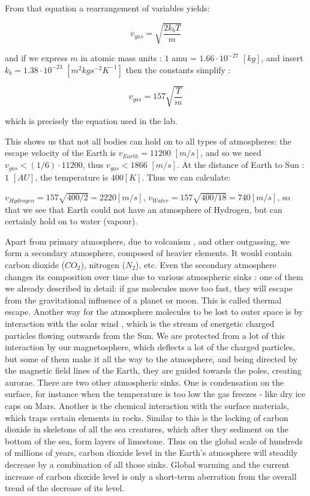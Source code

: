 \documentclass[paper=a4, fontsize=11pt]{scrartcl} %
\numberwithin{equation}{section} %
\begin{document}
From that equation  a rearrangement of variables yields:

\begin{equation}
v_{gas} = \sqrt{\frac{2 k_{b} T}{m}} 
\end{equation}

and if we express $m$ in  atomic mass units : $1$ amu = $1.66 \cdot 10^{-27}$ $[kg]$, and insert $k_{b}=1.38 \cdot 10^{-23} $ $[m^{2}kgs^{-2}K^{-1}]$ then the constants simplify :

\begin{equation}
v_{gas} = 157\sqrt{\frac{T}{m}}
\end{equation}

which is precisely the equation used in the lab. 

This shows us that not all bodies can hold on to all types of atmospheres: the escape velocity of the Earth is  $v_{Earth}=11200$ $[m/s]$, and so we need $v_{gas} < (1/6)  \cdot 11200 $, thus $v_{gas} < 1866 $ $[m/s]$. 
At the distance of Earth to Sun : $1$ $[AU]$, the temperature is $400  [K]$. Thus  we can calculate:

$v_{Hydrogen} = 157 \sqrt{400/2}= 2220 [m/s]$,  $v_{Water}=157 \sqrt{400/18}=740 [m/s]$, so that we see that Earth could not have an atmosphere of Hydrogen, but can certainly hold on to water (vapour). 



Apart from primary atmosphere, due to volcanism , and other outgassing, we form a secondary atmosphere, composed of heavier elements. It would contain carbon dioxide ($CO_{2}$), nitrogen ($N_{2}$), etc. 
Even the secondary atmosphere changes its composition over time due to various atmospheric sinks : one of them we already described in detail: if gas molecules move too fast, they will escape from the gravitational influence of a planet or moon. This is called thermal escape. Another way for the atmosphere molecules to be lost to outer space is by interaction with the solar wind , which is the stream of energetic charged particles flowing outwards from the Sun. We are protected from a lot of this interaction by our magnetosphere, which deflects a lot of the charged particles, but some of them make it all the way to the atmosphere, and being directed by the magnetic field lines of the Earth, they are guided towards the poles, creating aurorae. 
There are two other atmospheric sinks. One is condensation on the surface, for instance when the temperature is too low the gas freezes - like dry ice caps on Mars. Another is the chemical interaction with the surface materials, which traps certain elements in rocks. Similar to this is the locking of carbon dioxide in skeletons of all the sea creatures, which after they sediment on the bottom of the sea, form layers of limestone. Thus on the global scale of hundreds of millions of years, carbon dioxide level in the Earth's atmosphere will steadily decrease by a combination of all those sinks. Global warming and the current increase of carbon dioxide level is only a short-term aberration from the overall  trend of the decrease of its level. 
\end{document}
